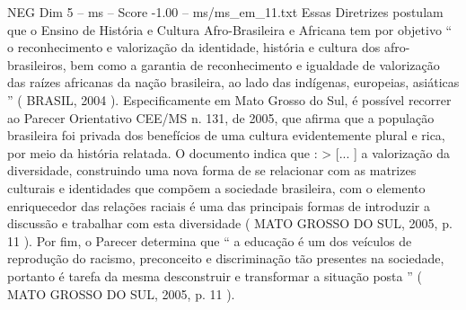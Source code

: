 \begin{textsample}{NEG Dim 5 – ms – Score -1.00 – ms/ms\_em\_11.txt}
Essas Diretrizes postulam que o Ensino de História e Cultura Afro-Brasileira e Africana tem por objetivo “ o reconhecimento e valorização da identidade, história e cultura dos afro-brasileiros, bem como a garantia de reconhecimento e igualdade de valorização das raízes africanas da nação brasileira, ao lado das indígenas, europeias, asiáticas ” ( BRASIL, 2004 ).
Especificamente em Mato Grosso do Sul, é possível recorrer ao Parecer Orientativo CEE/MS n. 131, de 2005, que afirma que a população brasileira foi privada dos benefícios de uma cultura evidentemente plural e rica, por meio da história relatada.
O documento indica que : > [... ] a valorização da diversidade, construindo uma nova forma de se relacionar com as matrizes culturais e identidades que compõem a sociedade brasileira, com o elemento enriquecedor das relações raciais é uma das principais formas de introduzir a discussão e trabalhar com esta diversidade ( MATO GROSSO DO SUL, 2005, p. 11 ).
Por fim, o Parecer determina que “ a educação é um dos veículos de reprodução do racismo, preconceito e discriminação tão presentes na sociedade, portanto é tarefa da mesma desconstruir e transformar a situação posta ” ( MATO GROSSO DO SUL, 2005, p. 11 ).

\end{textsample}
